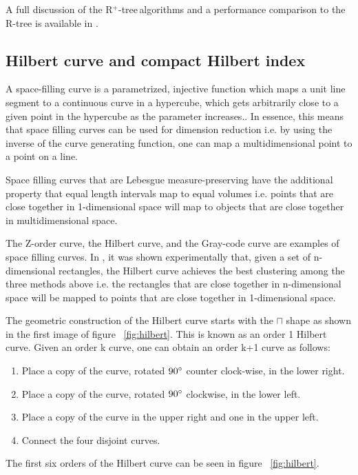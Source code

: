 \documentclass[11pt, a4paper, oneside]{article}
\newcommand{\rplus}{R$^+$-tree$\,$}
\begin{document}
A full discussion of the \rplus algorithms and a performance comparison to the R-tree is available in \cite{Sellis:1987:RDI:645914.671636}. 

\subsection{Hilbert curve and compact Hilbert index}
A space-filling curve is a parametrized, injective function which maps a unit line segment to a continuous curve in a hypercube, which gets arbitrarily close to a given point in the hypercube as the parameter increases.\cite{MR1299533}. In essence, this means that space filling curves can be used for dimension reduction i.e. by using the inverse of the curve generating function, one can map a multidimensional point to a point on a line.

Space filling curves that are Lebesgue measure-preserving have the additional property that equal length intervals map to equal volumes i.e. points that are close together in 1-dimensional space will map to objects that are close together in multidimensional space.

The Z-order curve, the Hilbert curve, and the Gray-code curve\cite{Faloutsos:1988:GCP:53064.53065} are examples of space filling curves. In \cite{Faloutsos:1989:FSK:73721.73746}, it was shown experimentally that, given a set of n-dimensional rectangles, the Hilbert curve achieves the best clustering among the three methods above i.e. the rectangles that are close together in n-dimensional space will be mapped to points that are close together in 1-dimensional space.

The geometric construction of the Hilbert curve starts with the $\sqcap$ shape as shown in the first image of figure ~\ref{fig:hilbert}. This is known as an order 1 Hilbert curve. Given an order k curve, one can obtain an order k+1 curve as follows:
\begin{enumerate}
\item Place a copy of the curve, rotated $90\degree$ counter clock-wise, in the lower right.
\item Place a copy of the curve, rotated $90\degree$ clockwise, in the lower left.
\item Place a copy of the curve in the upper right and one in the upper left.
\item Connect the four disjoint curves.
\end{enumerate} 

The first six orders of the Hilbert curve can be seen in figure ~\ref{fig:hilbert}.
\end{document}
